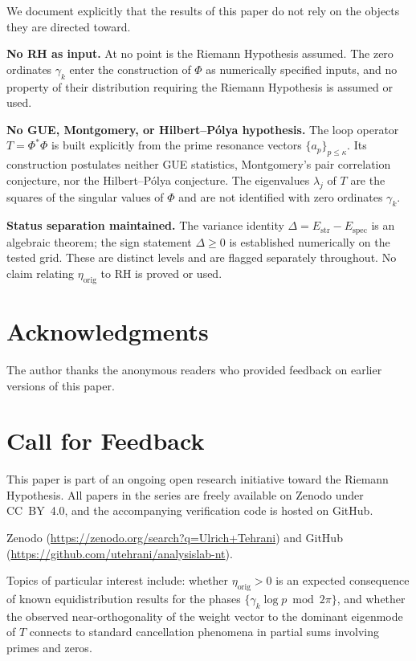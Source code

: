 \documentclass[11pt]{article}
\newcommand{\Estr}{E_{\mathrm{str}}}
\newcommand{\Espec}{E_{\mathrm{spec}}}
\newcommand{\etaorig}{\eta_{\mathrm{orig}}}
\begin{document}
We document explicitly that the results of this paper do not rely on
the objects they are directed toward.

\textbf{No RH as input.}
At no point is the Riemann Hypothesis assumed.
The zero ordinates $\gamma_k$ enter the construction of $\Phi$ as
numerically specified inputs, and no property of their distribution
requiring the Riemann Hypothesis is assumed or used.

\textbf{No GUE, Montgomery, or Hilbert--P\'olya hypothesis.}
The loop operator $T=\Phi^*\Phi$ is built explicitly from the prime
resonance vectors $\{a_p\}_{p\le\kappa}$. Its construction postulates
neither GUE statistics, Montgomery's pair correlation conjecture, nor
the Hilbert--P\'olya conjecture. The eigenvalues $\lambda_j$ of $T$ are
the squares of the singular values of $\Phi$ and are not identified
with zero ordinates $\gamma_k$.

\textbf{Status separation maintained.}
The variance identity $\Delta=\Estr-\Espec$ is an algebraic theorem;
the sign statement $\Delta\geq 0$ is established numerically on the
tested grid. These are distinct levels and are flagged separately
throughout. No claim relating $\etaorig$ to RH is proved or used.

\section*{Acknowledgments}

The author thanks the anonymous readers who provided feedback on
earlier versions of this paper.

\section*{Call for Feedback}

This paper is part of an ongoing open research initiative toward the
Riemann Hypothesis.
All papers in the series are freely available on Zenodo under CC~BY~4.0,
and the accompanying verification code is hosted on GitHub.

{\sloppy
Zenodo (\url{https://zenodo.org/search?q=Ulrich+Tehrani}) and GitHub
(\url{https://github.com/utehrani/analysislab-nt}).
\par}

Topics of particular interest include: whether $\etaorig>0$ is an
expected consequence of known equidistribution results for the phases
$\{\gamma_k\log p \bmod 2\pi\}$, and whether the observed
near-orthogonality of the weight vector to the dominant eigenmode of
$T$ connects to standard cancellation phenomena in partial sums
involving primes and zeros.
\end{document}
